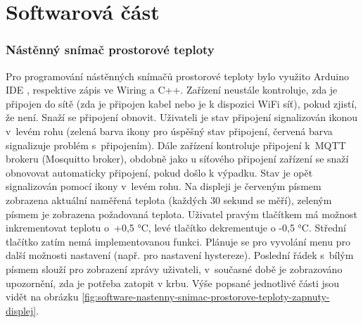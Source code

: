 \chapter{Softwarová část}

\subsection{Nástěnný snímač prostorové teploty}
Pro programování nástěnných snímačů prostorové teploty bylo využito Arduino IDE \cite{arduino-ide}, respektive zápis ve Wiring a C++. Zařízení neustále kontroluje, zda je připojen do sítě (zda je připojen kabel nebo je k dispozici WiFi síť), pokud zjistí, že není. Snaží se připojení obnovit. Uživateli je stav připojení signalizován ikonou v~levém rohu (zelená barva ikony pro úspěšný stav připojení, červená barva signalizuje problém s~připojením). Dále zařízení kontroluje připojení k~MQTT brokeru (Mosquitto broker), obdobně jako u síťového připojení zařízení se snaží obnovovat automaticky připojení, pokud došlo k výpadku. Stav je opět signalizován pomocí ikony v~levém rohu. Na displeji je červeným písmem zobrazena aktuální naměřená teplota (každých 30 sekund se měří), zeleným písmem je zobrazena požadovaná teplota. Uživatel pravým tlačítkem má možnost inkrementovat teplotu o~+0,5 °C, levé tlačítko dekrementuje o -0,5 °C. Střední tlačítko zatím nemá implementovanou funkci. Plánuje se pro vyvolání menu pro další možnosti nastavení (např. pro nastavení hystereze). Poslední řádek s~bílým písmem slouží pro zobrazení zprávy uživateli, v~současné době je zobrazováno upozornění, zda je potřeba zatopit v krbu. Výše popsané jednotlivé části jsou vidět na obrázku \ref{fig:software-nastenny-snimac-prostorove-teploty-zapnuty-displej}. 

